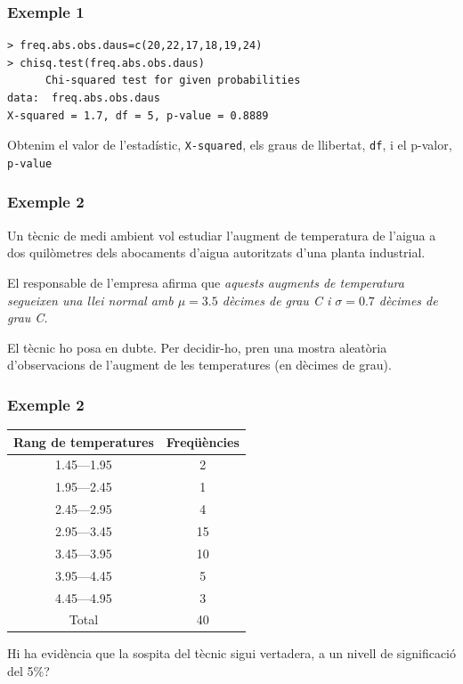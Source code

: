 \documentclass[12pt,t]{beamer}
\theoremstyle{plain}
\theoremstyle{definition}
\begin{document}
\begin{frame}[fragile]
\frametitle{Exemple 1}
\begin{verbatim}
> freq.abs.obs.daus=c(20,22,17,18,19,24)
> chisq.test(freq.abs.obs.daus)
      Chi-squared test for given probabilities
data:  freq.abs.obs.daus 
X-squared = 1.7, df = 5, p-value = 0.8889
\end{verbatim}
Obtenim el valor de l'estadístic, \texttt{X-squared}, els graus de llibertat, \texttt{df}, i el p-valor, \texttt{p-value}
\end{frame}





\begin{frame}
\frametitle{Exemple 2}

Un tècnic de medi ambient vol estudiar l'augment de temperatura de l'aigua
a dos quilòmetres dels abocaments d'aigua autoritzats d'una
planta industrial.
\bigskip

El responsable de l'empresa afirma que \textsl{aquests augments de temperatura segueixen una llei normal
amb $\mu=3.5$ dècimes de grau C  i $\sigma=0.7$  dècimes de grau C.}
\bigskip

El tècnic ho posa en dubte. Per decidir-ho, pren una mostra aleatòria d'observacions de l'augment
de les temperatures (en dècimes de grau).
\end{frame}

\begin{frame}
\frametitle{Exemple 2}

\begin{center}
\begin{tabular}{|c|c|}
\hline
Rang de temperatures & Freqüències
\\
\hline
1.45---1.95 & 2 \\
1.95---2.45 & 1 \\
2.45---2.95 & 4 \\
2.95---3.45 & 15 \\
3.45---3.95 & 10 \\
3.95---4.45 & 5 \\
4.45---4.95 & 3 \\
\hline
Total & 40\\  \hline
\end{tabular}
\end{center}
Hi ha evidència que la sospita del tècnic sigui vertadera, a un nivell de significació del 5\%?
\end{frame}
\end{document}
